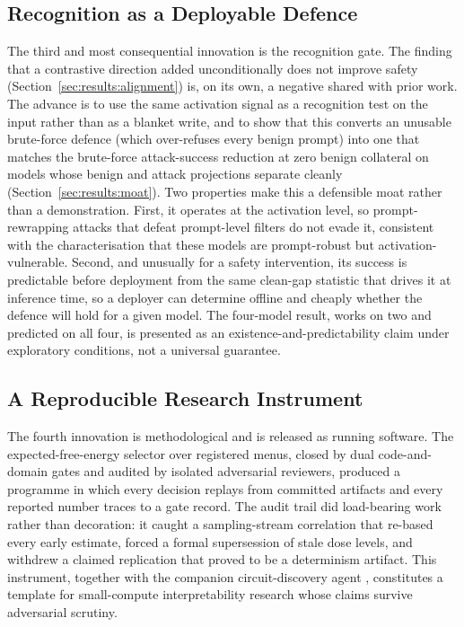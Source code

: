 \subsection{Recognition as a Deployable Defence}

The third and most consequential innovation is the recognition gate. The finding that a contrastive direction added unconditionally does not improve safety (Section~\ref{sec:results:alignment}) is, on its own, a negative shared with prior work. The advance is to use the same activation signal as a recognition test on the input rather than as a blanket write, and to show that this converts an unusable brute-force defence (which over-refuses every benign prompt) into one that matches the brute-force attack-success reduction at zero benign collateral on models whose benign and attack projections separate cleanly (Section~\ref{sec:results:moat}). Two properties make this a defensible moat rather than a demonstration. First, it operates at the activation level, so prompt-rewrapping attacks that defeat prompt-level filters do not evade it, consistent with the characterisation that these models are prompt-robust but activation-vulnerable. Second, and unusually for a safety intervention, its success is predictable before deployment from the same clean-gap statistic that drives it at inference time, so a deployer can determine offline and cheaply whether the defence will hold for a given model. The four-model result, works on two and predicted on all four, is presented as an existence-and-predictability claim under exploratory conditions, not a universal guarantee.

\subsection{A Reproducible Research Instrument}

The fourth innovation is methodological and is released as running software. The expected-free-energy selector over registered menus, closed by dual code-and-domain gates and audited by isolated adversarial reviewers, produced a programme in which every decision replays from committed artifacts and every reported number traces to a gate record. The audit trail did load-bearing work rather than decoration: it caught a sampling-stream correlation that re-based every early estimate, forced a formal supersession of stale dose levels, and withdrew a claimed replication that proved to be a determinism artifact. This instrument, together with the companion circuit-discovery agent \cite{Sathish2026ACD}, constitutes a template for small-compute interpretability research whose claims survive adversarial scrutiny.

